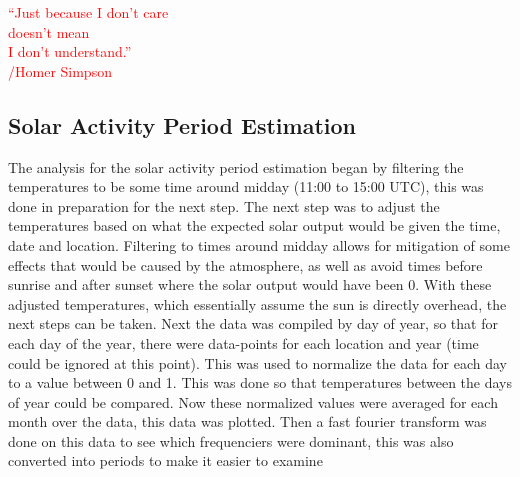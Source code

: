 {\Huge \textcolor{red}{“Just because I don’t care \\ doesn’t mean \\ I don’t understand.”}}\\\textcolor{red}{/Homer Simpson}\\

\subsection{Solar Activity Period Estimation}
The analysis for the solar activity period estimation began by filtering the temperatures to be some time around midday (11:00 to 15:00 UTC), this was done in preparation for the next step. The next step was to adjust the temperatures based on what the expected solar output would be given the time, date and location. Filtering to times around midday allows for mitigation of some effects that would be caused by the atmosphere, as well as avoid times before sunrise and after sunset where the solar output would have been 0. With these adjusted temperatures, which essentially assume the sun is directly overhead, the next steps can be taken. Next the data was compiled by day of year, so that for each day of the year, there were data-points for each location and year (time could be ignored at this point). This was used to normalize the data for each day to a value between 0 and 1. This was done so that temperatures between the days of year could be compared. Now these normalized values were averaged for each month over the data, this data was plotted. Then a fast fourier transform was done on this data to see which frequenciers were dominant, this was also converted into periods to make it easier to examine